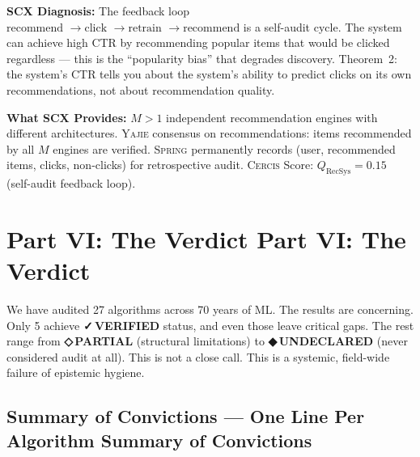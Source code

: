 \documentclass[12pt,a4paper]{article}
\theoremstyle{definition}
\newcommand{\guilty}{{\color{guiltycolor}\textbf{◆\,UNDECLARED}}}
\newcommand{\weakness}{{\color{weakcolor}\textbf{◇\,PARTIAL}}}
\newcommand{\verified}{{\color{verifiedcolor}\textbf{✓\,VERIFIED}}}
\newcommand{\Yajie}{\textsc{Yajie}}
\newcommand{\Spring}{\textsc{Spring}}
\newcommand{\Cercis}{\textsc{Cercis}}
\newcommand{\whatMissing}{\noindent\textbf{What SCX Provides:} }
\newcommand{\diagnosis}{\noindent\textbf{SCX Diagnosis:} }
\begin{document}
\diagnosis{} The feedback loop $\text{recommend } \to \text{click } \to \text{retrain } \to \text{recommend}$ is a self-audit cycle. The system can achieve high CTR by recommending popular items that would be clicked regardless — this is the ``popularity bias'' that degrades discovery. Theorem~2: the system's CTR tells you about the system's ability to predict clicks on its own recommendations, not about recommendation quality.

\whatMissing{} $M>1$ independent recommendation engines with different architectures. \Yajie{} consensus on recommendations: items recommended by all $M$ engines are verified. \Spring{} permanently records (user, recommended items, clicks, non-clicks) for retrospective audit. \Cercis{} Score: $Q_{\text{RecSys}} = 0.15$ (self-audit feedback loop).

\section{Part VI: The Verdict Part VI: The Verdict}
\label{sec:verdict}

We have audited 27 algorithms across 70 years of ML. The results are concerning. Only 5 achieve \verified{} status, and even those leave critical gaps. The rest range from \weakness{} (structural limitations) to \guilty{} (never considered audit at all). This is not a close call. This is a systemic, field-wide failure of epistemic hygiene.

\subsection{Summary of Convictions — One Line Per Algorithm Summary of Convictions}
\end{document}
